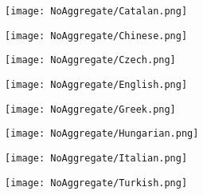\documentclass{article}
\begin{document}
\begin{figure}[H]
\centering
\texttt{[image: NoAggregate/Catalan.png]}
\label{fig:globfig}
\end{figure}

\begin{figure}[H]
\centering
\texttt{[image: NoAggregate/Chinese.png]}
\label{fig:globfig}
\end{figure}

\begin{figure}[H]
\centering
\texttt{[image: NoAggregate/Czech.png]}
\label{fig:globfig}
\end{figure}

\begin{figure}[H]
\centering
\texttt{[image: NoAggregate/English.png]}
\label{fig:globfig}
\end{figure}

\begin{figure}[H]
\centering
\texttt{[image: NoAggregate/Greek.png]}
\label{fig:globfig}
\end{figure}

\begin{figure}[H]
\centering
\texttt{[image: NoAggregate/Hungarian.png]}
\label{fig:globfig}
\end{figure}

\begin{figure}[H]
\centering
\texttt{[image: NoAggregate/Italian.png]}
\label{fig:globfig}
\end{figure}

\begin{figure}[H]
\centering
\texttt{[image: NoAggregate/Turkish.png]}
\label{fig:globfig}
\end{figure}
\end{document}
